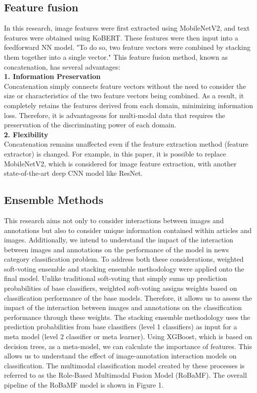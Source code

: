 \documentclass{article}
\begin{document}
\subsection{Feature fusion}
In this research, image features were first extracted using MobileNetV2, and text features were obtained using KoBERT. These features were then input into a feedforward NN model. "To do so, two feature vectors were combined by stacking them together into a single vector."
This feature fusion method, known as concatenation, has several advantages:\\

\textbf{1. Information Preservation}\\
Concatenation simply connects feature vectors without the need to consider the size or characteristics of the two feature vectors being combined. As a result, it completely retains the features derived from each domain, minimizing information loss. Therefore, it is advantageous for multi-modal data that requires the preservation of the discriminating power of each domain.\\

\textbf{2. Flexibility}\\
Concatenation remains unaffected even if the feature extraction method (feature extractor) is changed. For example, in this paper, it is possible to replace MobileNetV2, which is considered for image feature extraction, with another state-of-the-art deep CNN model like ResNet.\\


\subsection{Ensemble Methods}
This research aims not only to consider interactions between images and annotations but also to consider unique information contained within articles and images.
Additionally, we intend to understand the impact of the interaction between images and annotations on the performance of the model in news category classification problem.
To address both these considerations, weighted soft-voting ensemble and stacking ensemble methodology were applied onto the final model.
Unlike traditional soft-voting that simply sums up prediction probabilities of base classifiers, weighted soft-voting assigns weights based on classification performance of the base models.
Therefore, it allows us to assess the impact of the interaction between images and annotations on the classification performance through these weights.
The stacking ensemble methodology uses the prediction probabilities from base classifiers (level 1 classifiers) as input for a meta model (level 2 classifier or meta learner). Using XGBoost, which is based on decision trees, as a meta-model, we can calculate the importance of features. This  allows us to understand the effect of image-annotation interaction models on classification.
The multimodal classification model created by these processes is referred to as the Role-Based Multimodal Fusion Model (RoBaMF). The overall pipeline of the RoBaMF model is shown in Figure 1.
\end{document}
